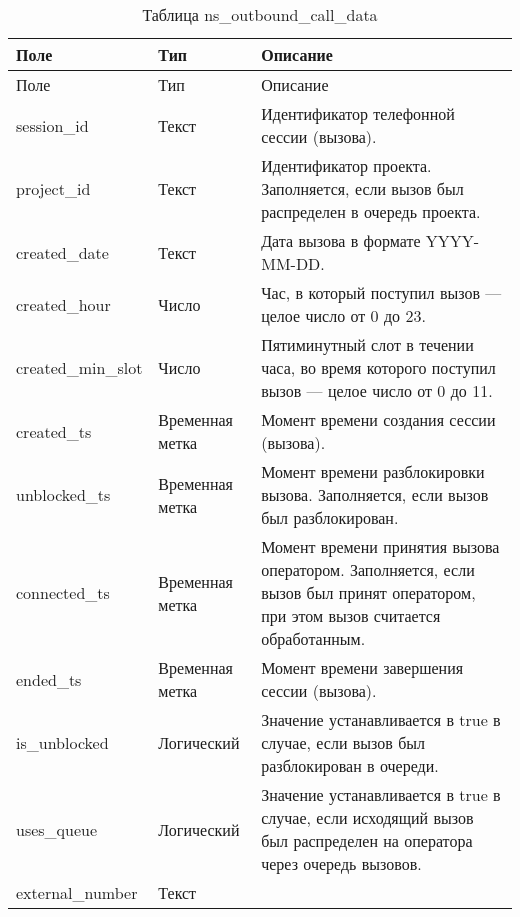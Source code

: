 \begin{small}
    \begin{longtable}{|p{}|p{}|p{}|}
        \caption{Таблица ns\_outbound\_call\_data}
        \label{tab:db:ns-outbound-call-data}
        \\ \hline
        Поле & Тип & Описание \\
        \hline \endfirsthead
        \hline
        Поле & Тип & Описание \\
        \hline
        \endhead
        \hline \endlastfoot
        session\_id &
        Текст &
                Идентификатор телефонной сессии (вызова).\\
\hline
        project\_id &
        Текст &
                Идентификатор проекта. Заполняется, если вызов был распределен в очередь проекта.\\
\hline
        created\_date &
        Текст &
                Дата вызова в формате YYYY-MM-DD.\\
\hline
        created\_hour &
        Число &
                Час, в который поступил вызов — целое число от 0 до 23.\\
\hline
        created\_min\_slot &
        Число &
                Пятиминутный слот в течении часа, во время которого поступил вызов — целое число от 0 до 11.\\
\hline
        created\_ts &
        Временная метка &
                Момент времени создания сессии (вызова).\\
\hline
        unblocked\_ts &
        Временная метка &
                Момент времени разблокировки вызова. Заполняется, если вызов был разблокирован.\\
\hline
        connected\_ts &
        Временная метка &
                Момент времени принятия вызова оператором. Заполняется, если вызов был принят оператором, при этом вызов считается обработанным.\\
\hline
        ended\_ts &
        Временная метка &
                Момент времени завершения сессии (вызова).\\
\hline
        is\_unblocked &
        Логический &
                Значение устанавливается в true в случае, если вызов был разблокирован в очереди.\\
\hline
        uses\_queue &
        Логический &
                Значение устанавливается в true в случае, если исходящий вызов был распределен на оператора через очередь вызовов.\\
\hline
        external\_number &
        Текст &

\end{longtable}
\end{small}
